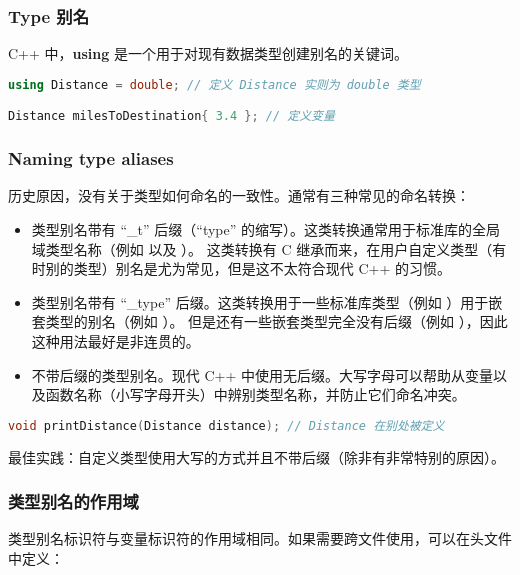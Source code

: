 \documentclass[../../LearnCpp.tex]{subfiles}
\begin{document}

\subsubsection*{Type 别名}

C++ 中，\textbf{using} 是一个用于对现有数据类型创建别名的关键词。

\begin{lstlisting}[language=C++]
using Distance = double; // 定义 Distance 实则为 double 类型

Distance milesToDestination{ 3.4 }; // 定义变量
\end{lstlisting}

\subsubsection*{Naming type aliases}

历史原因，没有关于类型如何命名的一致性。通常有三种常见的命名转换：

\begin{itemize}
    \item 类型别名带有 “\_t” 后缀（“type” 的缩写）。这类转换通常用于标准库的全局域类型名称（例如  以及 ）。
          这类转换有 C 继承而来，在用户自定义类型（有时别的类型）别名是尤为常见，但是这不太符合现代 C++ 的习惯。
    \item 类型别名带有 “\_type” 后缀。这类转换用于一些标准库类型（例如 ）用于嵌套类型的别名（例如 ）。
          但是还有一些嵌套类型完全没有后缀（例如 ），因此这种用法最好是非连贯的。
    \item 不带后缀的类型别名。现代 C++ 中使用无后缀。大写字母可以帮助从变量以及函数名称（小写字母开头）中辨别类型名称，并防止它们命名冲突。
\end{itemize}

\begin{lstlisting}[language=C++]
void printDistance(Distance distance); // Distance 在别处被定义
\end{lstlisting}

最佳实践：自定义类型使用大写的方式并且不带后缀（除非有非常特别的原因）。

\subsubsection*{类型别名的作用域}

类型别名标识符与变量标识符的作用域相同。如果需要跨文件使用，可以在头文件中定义：
\end{document}
